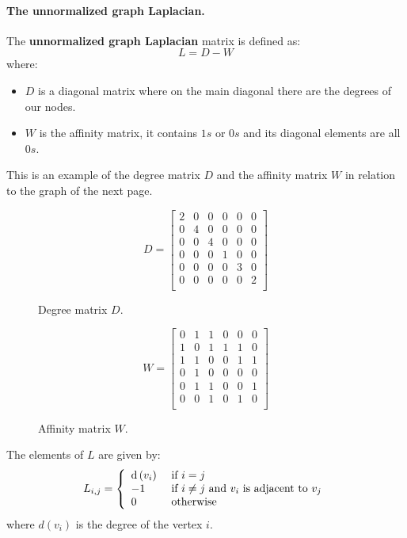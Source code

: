\paragraph{The unnormalized graph Laplacian.} The  \textbf{unnormalized graph Laplacian} matrix is defined as:
$$L = D - W$$
where:
\begin{itemize}
	\item $D$ is a diagonal matrix where on the main diagonal there are the degrees of our nodes.
	\item $W$ is the affinity matrix, it contains $1s$ or $0s$ and its diagonal elements are all $0s$.
\end{itemize}
This is an example of the degree matrix $D$ and the affinity matrix $W$ in relation to the graph of the next page.
\begin{figure}[H]
	\begin{minipage}[t]{0.49\linewidth} 
		\centering
		$$ D = \begin{bmatrix}
		2 & 0 & 0 & 0 & 0 & 0 \\
		0 & 4 & 0 & 0 & 0 & 0 \\
		0 & 0 & 4 & 0 & 0 & 0 \\
		0 & 0 & 0 & 1 & 0 & 0 \\
		0 & 0 & 0 & 0 & 3 & 0 \\
		0 & 0 & 0 & 0 & 0 & 2 \\
		\end{bmatrix}$$
		\caption{Degree matrix $D$.}
	\end{minipage}        
	\hspace{1cm}
	\begin{minipage}[t]{0.49\linewidth} 
		\centering
		$$ W = \begin{bmatrix}
		0 & 1 & 1 & 0 & 0 & 0 \\
		1 & 0 & 1 & 1 & 1 & 0 \\
		1 & 1 & 0 & 0 & 1 & 1 \\
		0 & 1 & 0 & 0 & 0 & 0 \\
		0 & 1 & 1 & 0 & 0 & 1 \\
		0 & 0 & 1 & 0 & 1 & 0 \\
		\end{bmatrix}$$
		\caption{Affinity matrix $W$.}
	\end{minipage}
\end{figure}

The elements of $L$ are given by:
$$
L _ { i , j } = \left\{ \begin{array} { l l } { \operatorname { d } \left( v _ { i } \right) } & { \text { if } i = j } \\ 
{ - 1 } & { \text { if } i \neq j \text { and } v _ { i } \text { is adjacent to } v _ { j } } \\ 
{ 0 } & { \text { otherwise } } \end{array} \right.
$$
where $d(v_i)$ is the degree of the vertex $i$.

